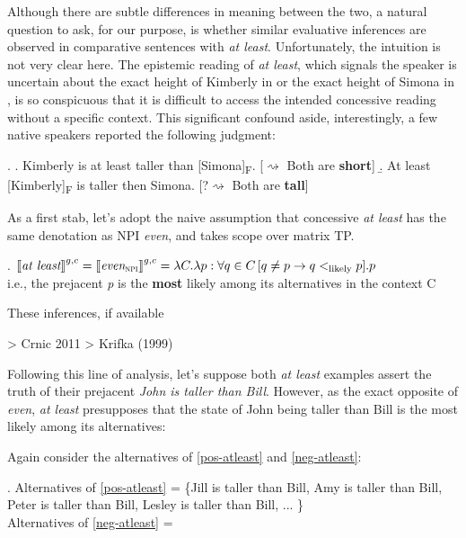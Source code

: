 \documentclass[12pt,letterpaper]{scrartcl}
\newcommand{\alignright}{\hspace*{\fill}}
\newcommand{\infer}{$\rightsquigarrow$ }
\newcommand{\sub}[1]{\textsubscript{#1}}
\begin{document}
Although there are subtle differences in meaning between the two, a natural question to ask, for our purpose, is whether similar evaluative inferences are observed in comparative sentences with \textit{at least}. Unfortunately, the intuition is not very clear here. The epistemic reading of \textit{at least}, which signals the speaker is uncertain about the exact height of Kimberly in \Next[a] or the exact height of Simona in \Next[b], is so conspicuous that it is difficult to access the intended concessive reading without a specific context. This significant confound aside, interestingly, a few native speakers reported the following judgment:

\ex. \label{at-least} \a. Kimberly is at least taller than [Simona]\sub{F}. \label{neg-atleast} \alignright [\infer Both are \textbf{short}]
\b. At least [Kimberly]\sub{F} is taller then Simona. \label{pos-atleast} \alignright [?\infer Both are \textbf{tall}]

As a first stab, let's adopt the naive assumption that concessive \textit{at least} has the same denotation as NPI \textit{even}, and takes scope over matrix TP.

\ex. $|[\textit{at least}|]^{g, c} = |[\textit{even}\sub{\textsc{npi}}|]^{g, c} = \lambda C. \lambda p : \forall q \in C \, [q \neq p \rightarrow q <_{\text{likely}} p]. p$ \\ i.e., the prejacent \textit{p} is the \textbf{most} likely among its alternatives in the context C













\newpage

These inferences, if available


> Crnic 2011
> Krifka (1999)




Following this line of analysis, let's suppose both \textit{at least} examples assert the truth of their prejacent \textit{John is taller than Bill}. However, as the exact opposite of \textit{even}, \textit{at least} presupposes that the state of John being taller than Bill is the most likely among its alternatives:

Again consider the alternatives of \ref{pos-atleast} and \ref{neg-atleast}:

\ex. Alternatives of \ref{pos-atleast} =  \{Jill is taller than Bill, Amy is taller than Bill, Peter is taller than Bill, Lesley is taller than Bill, ... \} \\
Alternatives of \ref{neg-atleast} =  
\end{document}
